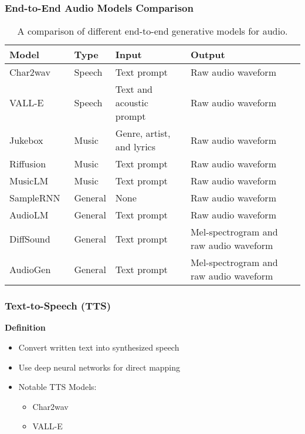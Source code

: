 \begin{frame}
    \frametitle{End-to-End Audio Models Comparison}

    \begin{table}[ht]
        \centering
        \caption{A comparison of different end-to-end generative models for audio.}
        \begin{tabularx}{\textwidth}{|X|l|X|X|}
            \hline
            \textbf{Model}                           & \textbf{Type} & \textbf{Input}            & \textbf{Output} \\ \hline
            Char2wav~\cite{sotelo_char2wav_2017}     & Speech        & Text prompt               & Raw audio waveform \\ \hline
            VALL-E~\cite{wang_neural_2023}           & Speech        & Text and acoustic prompt  & Raw audio waveform \\ \hline
            Jukebox~\cite{dhariwal_jukebox_2020}     & Music         & Genre, artist, and lyrics & Raw audio waveform \\ \hline
            Riffusion~\cite{forsgren_riffusion_2022} & Music         & Text prompt               & Raw audio waveform \\ \hline
            MusicLM~\cite{agostinelli_musiclm_2023}  & Music         & Text prompt               & Raw audio waveform \\ \hline
            SampleRNN~\cite{mehri_samplernn_2017}    & General       & None                      & Raw audio waveform \\ \hline
            AudioLM~\cite{borsos_audiolm_2022}       & General       & Text prompt               & Raw audio waveform \\ \hline
            DiffSound~\cite{yang_diffsound_2022}     & General       & Text prompt               & Mel-spectrogram and raw audio waveform \\ \hline
            AudioGen~\cite{kreuk_audiogen_2023}      & General       & Text prompt               & Mel-spectrogram and raw audio waveform \\ \hline
        \end{tabularx}
        \label{tab:end-to-end-audio-models}
    \end{table}
\end{frame}

\begin{frame}
    \frametitle{Text-to-Speech (TTS)}

    \textbf{Definition}
    \begin{itemize}
        \item Convert written text into synthesized speech
        \item Use deep neural networks for direct mapping
        \item Notable TTS Models:
            \begin{itemize}
                \item Char2wav
                \item VALL-E
            \end{itemize}
    \end{itemize}
\end{frame}

